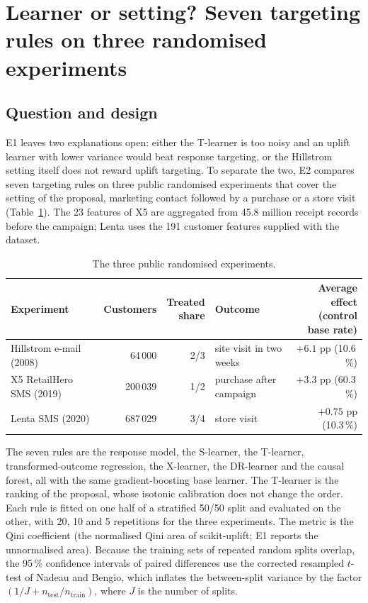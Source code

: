 \section{Learner or setting? Seven targeting rules on three randomised experiments}

\subsection{Question and design}
E1 leaves two explanations open: either the T-learner is too noisy and an uplift learner with lower variance would beat response targeting, or the Hillstrom setting itself does not reward uplift targeting. To separate the two, E2 compares seven targeting rules on three public randomised experiments that cover the setting of the proposal, marketing contact followed by a purchase or a store visit (Table~\ref{tab:mt-data}). The 23 features of X5 are aggregated from 45.8 million receipt records before the campaign; Lenta uses the 191 customer features supplied with the dataset.

\begin{table}[htbp]\centering\small
\caption{The three public randomised experiments.}\label{tab:mt-data}\setlength{\tabcolsep}{4pt}
\begin{tabular}{lrrlr}\toprule
Experiment & Customers & \hd{Treated\\share} & Outcome & \hd{Average effect\\(control base rate)}\\\midrule
Hillstrom e-mail (2008) & 64\,000 & 2/3 & site visit in two weeks & $+6.1$ pp (10.6\,\%)\\
X5 RetailHero SMS (2019) & 200\,039 & 1/2 & purchase after campaign & $+3.3$ pp (60.3\,\%)\\
Lenta SMS (2020) & 687\,029 & 3/4 & store visit & $+0.75$ pp (10.3\,\%)\\\bottomrule
\end{tabular}
\end{table}

The seven rules are the response model, the S-learner, the T-learner, transformed-outcome regression\cite{athey2016}, the X-learner\cite{kunzel2019}, the DR-learner\cite{kennedy2023} and the causal forest\cite{athey2019}, all with the same gradient-boosting base learner. The T-learner is the ranking of the proposal, whose isotonic calibration does not change the order. Each rule is fitted on one half of a stratified 50/50 split and evaluated on the other, with 20, 10 and 5 repetitions for the three experiments. The metric is the Qini coefficient (the normalised Qini area of scikit-uplift; E1 reports the unnormalised area). Because the training sets of repeated random splits overlap, the 95\,\% confidence intervals of paired differences use the corrected resampled $t$-test of Nadeau and Bengio\cite{nadeau2003}, which inflates the between-split variance by the factor $(1/J+n_{\mathrm{test}}/n_{\mathrm{train}})$, where $J$ is the number of splits.

